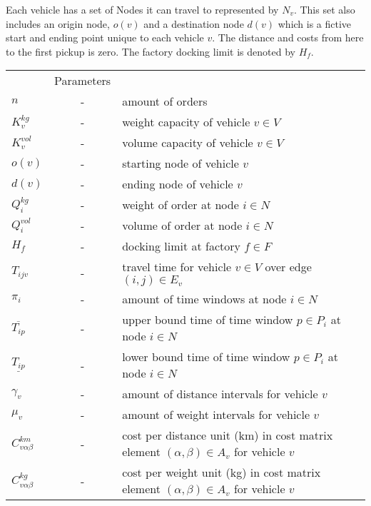 \documentclass[a4paper,10pt]{article}
\begin{document}
Each vehicle has a set of Nodes it can travel to represented by $N_v$.
This set also includes an origin node, $o(v)$ and a destination node $d(v)$ which is a fictive start and ending point unique to each vehicle $v$. 
The distance and costs from here to the first pickup is zero.
The factory docking limit is denoted by $H_f$. 
\begin{tabular}{l c l }
    			        &Parameters 							\\ 
    $n    	            $   &-& amount of orders     					\\
    $K_v^{kg}  	            $   &-& weight capacity of vehicle $v\in V$	 			\\
    $K_v^{vol} 	            $   &-& volume capacity of vehicle $v\in V$	 			\\
    $o(v)                   $   &-& starting node of vehicle $v$                                \\
    $d(v)                   $   &-& ending node of vehicle $v$                                  \\
    $Q_i^{kg}  	            $	&-& weight of order at node $i\in N$				\\
    $Q_i^{vol} 	            $	&-& volume of order at node $i\in N$				\\
    $H_f  	            $	&-& docking limit at factory $f\in F$				\\
    $T_{ijv}                $ 	&-& travel time for vehicle $v\in V$ over edge $(i,j)\in E_v$	\\
    $\pi_i	            $	&-& amount of time windows at node $i\in N$			\\ 
    $\overline{T_{ip}}      $   &-& upper bound time of time window $p\in P_i$ at node $i\in N$ \\
    $\underline{T_{ip}}     $	&-& lower bound time of time window $p\in P_i$ at node $i\in N$ \\
    $\gamma_v               $   &-& amount of distance intervals for vehicle $v$                \\
    $\mu_v                  $   &-& amount of weight intervals for vehicle $v$                  \\                   
    $C^{km}_{v\alpha\beta}  $	&-& cost per distance unit (km) in cost matrix element 
                                    $(\alpha, \beta) \in A_v$ for vehicle $v$	                \\
    $C^{kg}_{v\alpha\beta}  $	&-& cost per weight unit (kg) in cost matrix element 
                                    $(\alpha, \beta) \in A_v$ for vehicle $v$	                \\

\end{tabular}
\end{document}
